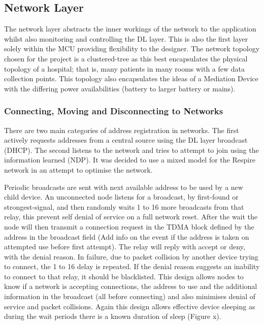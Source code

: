 \subsection{Network Layer}
The network layer abstracts the inner workings of the network to the application whilst also
monitoring and controlling the \ac{DL} layer. This is also the first layer solely within the \ac{MCU}
providing flexibility to the designer.
The network topology chosen for the project is a clustered-tree as this best encapsulates the
physical topology of a hospital; that is, many patients in many rooms with a few data collection
points. This topology also encapsulates the ideas of a Mediation Device with the differing power
availabilities (battery to larger battery or mains)\cite{4517407}.

\subsubsection{Connecting, Moving and Disconnecting to Networks}
There are two main categories of address registration in networks. The first actively requests
addresses from a central source using the DL layer broadcast (\eg \ac{DHCP}). The second listens to the
network and tries to attempt to join using the information learned (\eg \ac{NDP}). It was decided to
use a mixed model for the Respire network in an attempt to optimise the network.


Periodic broadcasts are sent with next available address to be used by a new child device. An
unconnected node listens for a broadcast, by first-found or strongest-signal, and then randomly
waits 1 to 16 more broadcasts from that relay, this prevent self denial of service on a full network
reset. After the wait the node will then transmit a connection request in the \ac{TDMA} block defined by
the address in the broadcast field (Add info on the event if the address is taken on attempted use
before first attempt). The relay will reply with accept or deny, with the denial reason. In failure, due
to packet collision by another device trying to connect, the 1 to 16 delay is repeated. If the denial
reason suggests an inability to connect to that relay, it should be blacklisted. This design allows
nodes to know if a network is accepting connections, the address to use and the additional
information in the broadcast (all before connecting) and also minimises denial of service and packet
collisions. Again this design allows effective device sleeping as during the wait periods there is a
known duration of sleep (Figure x). %


